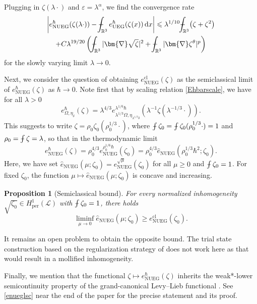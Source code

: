 \documentclass[final,onefignum,onetabnum,reqno]{amsart}
\newtheorem{proposition}[theorem]{Proposition}
\theoremstyle{remark}
\renewcommand{\le}{\leqslant}
\renewcommand{\ge}{\geqslant}
\renewcommand{\epsilon}{\varepsilon}
\newcommand{\wh}[1]{\widehat{#1}}
\newcommand{\RR}{\mathbb{R}}
\newcommand{\per}{\mathrm{per}} %
\newcommand{\cl}{\mathrm{cl}} %
\newcommand{\UEG}{\mathrm{UEG}} %
\newcommand{\NUEG}{\mathrm{NUEG}} %
\newcommand{\grad}{\bm{\nabla}} %
\newcommand{\dd}{\mathrm{d}} %
\def\Xint#1{\mathchoice
{\XXint\displaystyle\textstyle{#1}}%
{\XXint\textstyle\scriptstyle{#1}}%
{\XXint\scriptstyle\scriptscriptstyle{#1}}%
{\XXint\scriptscriptstyle\scriptscriptstyle{#1}}%
\!\int}
\def\XXint#1#2#3{{\setbox0=\hbox{$#1{#2#3}{\int}$ }
\vcenter{\hbox{$#2#3$ }}\kern-.6\wd0}}
\def\dashint{\Xint-}
\newcommand{\LC}{\mathcal{L}}
\begin{document}
Plugging in $\zeta(\lambda\cdot)$ and $\epsilon=\lambda^\alpha$, we find the convergence rate 
\begin{multline*}
\left| e_\NUEG^\hbar(\zeta(\lambda\cdot)) - \dashint_{\RR^3} e_\UEG^\hbar(\zeta(x))\,\dd x\right|\le \lambda^{1/10} \dashint_{\RR^3} \bigl( \zeta + \zeta^2 \bigr)\\
+ C\lambda^{19/20}\left( \dashint_{\RR^3} |\grad\sqrt{\zeta}|^2 + \dashint_{\RR^3} |\grad\zeta^\theta|^p \right)
\end{multline*}
for the slowly varying limit $\lambda\to 0$. 

Next, we consider the question of obtaining $e_\NUEG^\cl(\zeta)$ as the semiclassical limit of $e_\NUEG^\hbar(\zeta)$ as $\hbar\to 0$. Note first that by scaling relation \cref{Ehbarscale}, we have for all $\lambda>0$
$$
e_{\Omega,\eta_\delta}^\hbar(\zeta)=\lambda^{4/3} e_{\lambda^{1/3}\Omega,\eta_{\lambda^{1/3}\delta}}^{\lambda^{1/6}\hbar}(\lambda^{-1}\zeta(\lambda^{-1/3}\cdot)).
$$
This suggests to write $\zeta=\rho_0\zeta_0(\rho_0^{1/3}\cdot)$, where $\dashint\zeta_0=\dashint \zeta_0(\rho_0^{1/3}\cdot)=1$ and $\rho_0=\dashint\zeta=\lambda$, so that in the thermodynamic limit
$$
e_{\NUEG}^\hbar(\zeta)=\rho_0^{4/3} e_\NUEG^{\rho_0^{1/6}\hbar}(\zeta_0)=\rho_0^{4/3} \wh{e}_\NUEG(\rho_0^{1/3}\hbar^2;\zeta_0).
$$
Here, we have set $\wh{e}_\NUEG(\mu;\zeta_0)=e_\NUEG^{\sqrt{\mu}}(\zeta_0)$ for all $\mu\ge 0$ and $\dashint\zeta_0=1$. 
For fixed $\zeta_0$, the function $\mu\mapsto\wh{e}_\NUEG(\mu;\zeta_0)$ is concave and increasing.

\begin{proposition}[Semiclassical bound]\label{semiclassthm}
For every normalized inhomogeneity $\sqrt{\zeta_0}\in H^1_\per(\LC)$ with $\dashint\zeta_0=1$, there holds
$$
\liminf_{\mu\to 0} \wh{e}_\NUEG(\mu;\zeta_0)\ge e_\NUEG^\cl(\zeta_0).
$$
\end{proposition}

It remains an open problem to obtain the opposite bound. The trial state construction
based on the regularization strategy of \cite{lewin2018statistical} does not work here as 
that would result in a mollified inhomogeneity. 

Finally, we mention that the functional $\zeta\mapsto e_\NUEG^\hbar(\zeta)$ inherits the weak*-lower semicontinuity property of the grand-canonical Levy--Lieb functional \cite{lewin2019universal}. See \cref{enueglsc} near the end of the paper for the precise statement and its proof.

\end{document}
